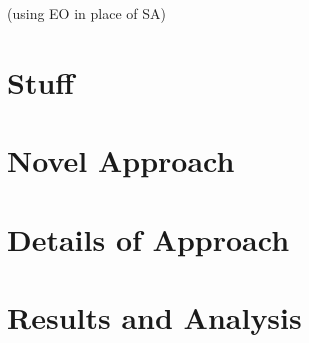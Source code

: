 \documentclass[12pt]{article}
\begin{document}
  (using EO in place of SA)


\section{Stuff} %

\section{} %

\section{} %

\section{Novel Approach} %

\section{Details of Approach}%

\section{Results and Analysis}




\end{document}
